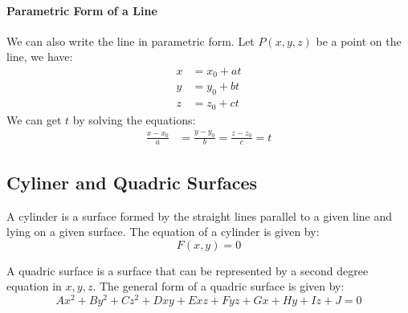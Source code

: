 \documentclass[11pt]{article}
\begin{document}
    \paragraph{Parametric Form of a Line} We can also write the line in parametric form. Let $P(x, y, z)$ be a point on the line, we have:
    \begin{align}
        x &= x_0 + at \\
        y &= y_0 + bt \\
        z &= z_0 + ct
    \end{align}
    We can get $t$ by solving the equations:
    \begin{align}
        \frac{x-x_0}{a} &= \frac{y-y_0}{b} = \frac{z-z_0}{c} = t
    \end{align}
\subsection{Cyliner and Quadric Surfaces}
\begin{definition}[Cylinder]
    A cylinder is a surface formed by the straight lines parallel to a given line and lying on a given surface. The equation of a cylinder is given by:
    \begin{equation}
        F(x, y) = 0
    \end{equation}
\end{definition}
\begin{definition}
    A quadric surface is a surface that can be represented by a second degree equation in $x, y, z$. The general form of a quadric surface is given by:
    \begin{equation}
        Ax^2 + By^2 + Cz^2 + Dxy + Exz + Fyz + Gx + Hy + Iz + J = 0
    \end{equation}
\end{definition}
\end{document}
